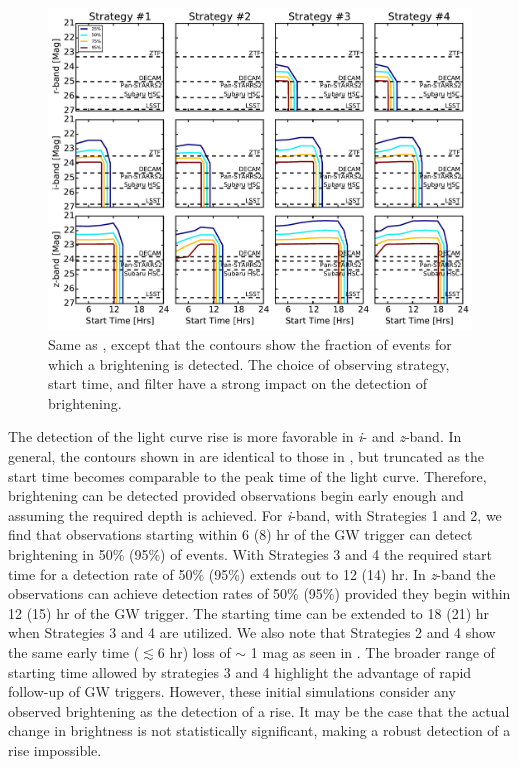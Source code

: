 \begin{figure}[t!]
\centering
\includegraphics[width=\textwidth]{./figs/chapter2/ch2_f5.pdf}
\caption{Same as , except that the contours show the fraction of events for which a brightening is detected. The choice of observing strategy, start time, and filter have a strong impact on the detection of brightening.}
\label{fig:ch2_rise}
\end{figure}

The detection of the light curve rise is more favorable in {\em i}- and {\em z}-band. In general, the contours shown in  are identical to those in , but truncated as the start time becomes comparable to the peak time of the light curve. Therefore, brightening can be detected provided observations begin early enough and assuming the required depth is achieved. For {\em i}-band, with Strategies 1 and 2, we find that observations starting within 6 (8) hr of the GW trigger can detect brightening in 50\% (95\%) of events. With Strategies 3 and 4 the required start time for a detection rate of 50\% (95\%) extends out to 12 (14) hr. In {\em z}-band the observations can achieve detection rates of 50\% (95\%) provided they begin within 12 (15) hr of the GW trigger. The starting time can be extended to 18 (21) hr when Strategies 3 and 4 are utilized. We also note that Strategies 2 and 4 show the same early time ($\lesssim 6$ hr) loss of $\sim$ 1 mag as seen in . The broader range of starting time allowed by strategies 3 and 4 highlight the advantage of rapid follow-up of GW triggers. However, these initial simulations consider any observed brightening as the detection of a rise. It may be the case that the actual change in brightness is not statistically significant, making a robust detection of a rise impossible.

